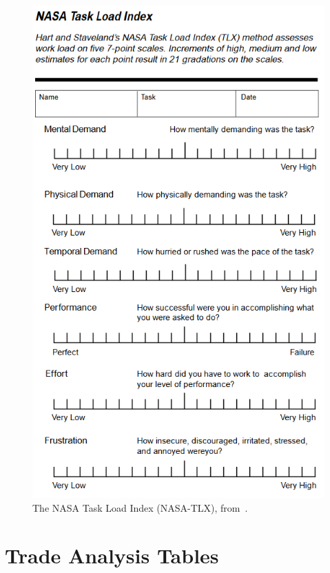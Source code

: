 \begin{figure}[tbp]
    \begin{center}
        \includegraphics[width=0.8\linewidth]{figures/Introduction/NASA-TLX.png}
        \caption[The NASA Task Load Index (NASA-TLX)]{The NASA Task Load Index (NASA-TLX), from~\citet{hart_development_1988}.}
        \label{figure:nasa-tlx}
    \end{center}
\end{figure}

\chapter{Trade Analysis Tables} \label{appendix:trade-tables}

